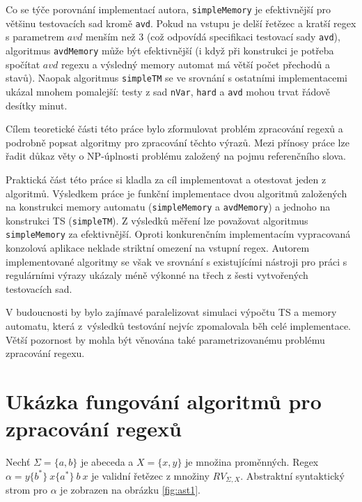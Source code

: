 \documentclass[thesis=B,czech]{FITthesis}[2019/12/23]
\theoremstyle{definition}
\begin{document}
Co se týče porovnání implementací autora, \texttt{simpleMemory} je efektivnější pro většinu testovacích sad kromě \texttt{avd}. Pokud na vstupu je delší řetězec a kratší regex s parametrem $avd$ menším než 3 (což odpovídá specifikaci testovací sady \texttt{avd}), algoritmus \texttt{avdMemory} může být efektivnější (i když při konstrukci je potřeba spočítat $avd$ regexu a výsledný memory automat má větší počet přechodů a stavů). Naopak algoritmus \texttt{simpleTM} se ve srovnání s ostatními implementacemi ukázal mnohem pomalejší: testy z sad \texttt{nVar}, \texttt{hard} a \texttt{avd} mohou trvat řádově desítky minut.

\begin{conclusion}
Cílem teoretické části této práce bylo zformulovat problém zpracování regexů a podrobně popsat algoritmy pro zpracování těchto výrazů.  
Mezi přínosy práce lze řadit důkaz věty o NP-úplnosti problému založený na pojmu referenčního slova.

Praktická část této práce si kladla za cíl implementovat a otestovat jeden z algoritmů. Výsledkem práce je funkční implementace dvou algoritmů založených na konstrukci memory automatu (\texttt{simpleMemory} a \texttt{avdMemory}) a jednoho na konstrukci TS (\texttt{simpleTM}). Z výsledků měření lze považovat algoritmus \texttt{simpleMemory} za efektivnější. Oproti konkurenčním implementacím vypracovaná konzolová aplikace neklade striktní omezení na vstupní regex.  Autorem implementované algoritmy se však ve srovnání s existujícími nástroji pro práci s regulárními výrazy ukázaly méně výkonné na třech z šesti vytvořených testovacích sad.

V budoucnosti by bylo zajímavé paralelizovat simulaci výpočtu TS a memory automatu, která z~výsledků testování nejvíc zpomalovala běh celé implementace. Větší pozornost by mohla být věnována také parametrizovanému problému zpracování regexu.  

\end{conclusion}




\appendix

\chapter{Ukázka fungování algoritmů pro zpracování regexů}
Nechť $\Sigma = \{a, b\}$ je abeceda a $X = \{x, y\}$ je množina proměnných. Regex $\alpha = y\{b^\ast\} \ x\{a^\ast\} \ b \ x$ je validní řetězec z množiny $RV_{\Sigma, X}$. Abstraktní syntaktický strom pro $\alpha$ je zobrazen na obrázku \ref{fig:ast1}.
\end{document}
